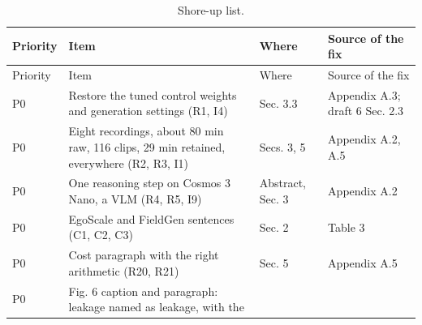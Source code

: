 \documentclass[
  11pt,
]{article}
\begin{document}
\begin{longtable}[]{@{}
  >{\raggedright\arraybackslash}p{}
  >{\raggedright\arraybackslash}p{}
  >{\raggedright\arraybackslash}p{}
  >{\raggedright\arraybackslash}p{}@{}}
\caption{Shore-up list.}\tabularnewline
\toprule\noalign{}
\begin{minipage}[b]{\linewidth}\raggedright
Priority
\end{minipage} & \begin{minipage}[b]{\linewidth}\raggedright
Item
\end{minipage} & \begin{minipage}[b]{\linewidth}\raggedright
Where
\end{minipage} & \begin{minipage}[b]{\linewidth}\raggedright
Source of the fix
\end{minipage} \\
\midrule\noalign{}
\endfirsthead
\toprule\noalign{}
\begin{minipage}[b]{\linewidth}\raggedright
Priority
\end{minipage} & \begin{minipage}[b]{\linewidth}\raggedright
Item
\end{minipage} & \begin{minipage}[b]{\linewidth}\raggedright
Where
\end{minipage} & \begin{minipage}[b]{\linewidth}\raggedright
Source of the fix
\end{minipage} \\
\midrule\noalign{}
\endhead
\bottomrule\noalign{}
\endlastfoot
P0 & Restore the tuned control weights and generation settings (R1, I4)
& Sec. 3.3 & Appendix A.3; draft 6 Sec. 2.3 \\
P0 & Eight recordings, about 80 min raw, 116 clips, 29 min retained,
everywhere (R2, R3, I1) & Secs. 3, 5 & Appendix A.2, A.5 \\
P0 & One reasoning step on Cosmos 3 Nano, a VLM (R4, R5, I9) & Abstract,
Sec. 3 & Appendix A.2 \\
P0 & EgoScale and FieldGen sentences (C1, C2, C3) & Sec. 2 & Table 3 \\
P0 & Cost paragraph with the right arithmetic (R20, R21) & Sec. 5 &
Appendix A.5 \\
P0 & Fig. 6 caption and paragraph: leakage named as leakage, with the

\end{longtable}
\end{document}

